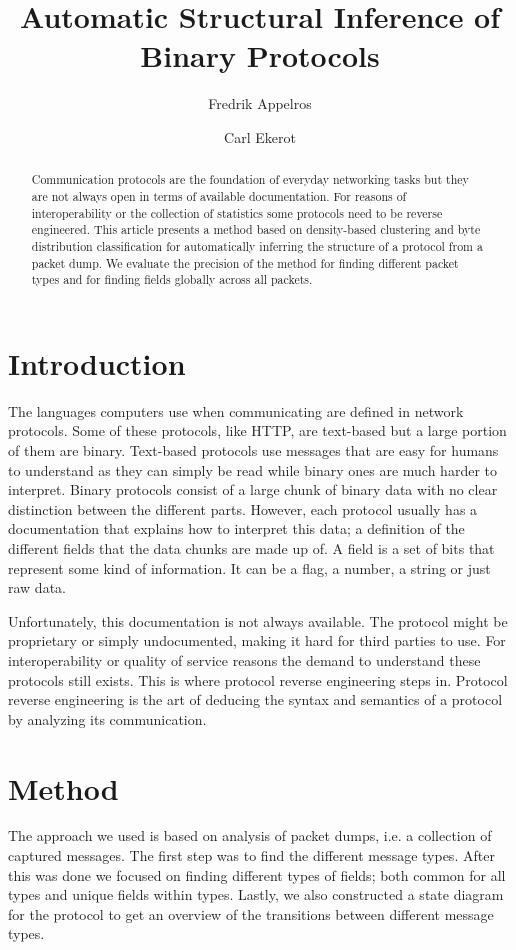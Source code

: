 \documentclass[a4paper,twocolumn]{article}
\begin{document}
\title{Automatic Structural Inference of Binary Protocols}
\author{Fredrik Appelros \and Carl Ekerot}
\maketitle

\begin{abstract}
Communication protocols are the foundation of everyday networking tasks but
they are not always open in terms of available documentation. For reasons of
interoperability or the collection of statistics some protocols need to be
reverse engineered. This article presents a method based on density-based
clustering and byte distribution classification for automatically inferring the
structure of a protocol from a packet dump. We evaluate the precision of the
method for finding different packet types and for finding fields globally
across all packets.
\end{abstract}

\section{Introduction}
The languages computers use when communicating are defined in network protocols.
Some of these protocols, like HTTP, are text-based but a large portion of them
are binary. Text-based protocols use messages that are easy for humans to
understand as they can simply be read while binary ones are much harder to
interpret. Binary protocols consist of a large chunk of binary data with no
clear distinction between the different parts. However, each protocol usually
has a documentation that explains how to interpret this data; a definition of
the different fields that the data chunks are made up of. A field is a set of
bits that represent some kind of information. It can be a flag, a number, a
string or just raw data.

Unfortunately, this documentation is not always available. The protocol might
be proprietary or simply undocumented, making it hard for third parties to use.
For interoperability or quality of service reasons the demand to understand
these protocols still exists. This is where protocol reverse engineering steps
in. Protocol reverse engineering is the art of deducing the syntax and
semantics of a protocol by analyzing its communication.

\section{Method}
The approach we used is based on analysis of packet dumps, i.e. a collection
of captured messages. The first step was to find the different message types.
After this was done we focused on finding different types of fields; both
common for all types and unique fields within types. Lastly, we also
constructed a state diagram for the protocol to get an overview of the
transitions between different message types.
\end{document}
